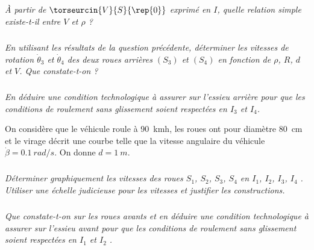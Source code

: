 \begin{multicols}{2}
\subparagraph{}
\textit{À partir de $\torseurcin{V}{S}{\rep{0}}$ exprimé en $I$, quelle relation simple existe-t-il entre $V$ et $\rho$ ?}
\ifprof%
\begin{corrige}
\end{corrige}\else\fi
\subparagraph{}
\textit{En utilisant les résultats de la question précédente, déterminer les vitesses de rotation $\dot{\theta}_3$ et $\dot{\theta}_4$ des deux roues arrières $(S_3)$ et $(S_4)$ en fonction de $\rho$, $R$, $d$ et $V$. Que constate-t-on ? }
\ifprof%
\begin{corrige}
\end{corrige}\else\fi
\subparagraph{}
\textit{En déduire une condition technologique à assurer sur l'essieu arrière pour que les conditions de roulement sans glissement soient respectées en $I_3$ et $I_4$. }
\ifprof%
\begin{corrige}
\end{corrige}\else\fi

On considère que le véhicule roule à \SI{90}{km}{h}, les roues ont pour diamètre \SI{80}{cm} et le virage décrit une courbe telle que la vitesse angulaire du véhicule  $\dot{\beta}=\SI{0,1}{rad/s}$. On donne $d=\SI{1}{m}$. 

\subparagraph{}
\textit{Déterminer graphiquement les vitesses des roues $S_1$, $S_2$, $S_3$, $S_4$ en $I_1$, $I_2$, $I_3$, $I_4$ . Utiliser une échelle judicieuse pour les vitesses et  justifier les constructions.}
\ifprof%
\begin{corrige}
\end{corrige}\else\fi
\subparagraph{}
\textit{Que constate-t-on sur les roues avants et en déduire une condition technologique à assurer sur l'essieu avant pour que les conditions de roulement sans glissement soient respectées en $I_1$ et $I_2$ . }
\ifprof%
\begin{corrige}
\end{corrige}\else\fi


\ifprof
\else
\end{multicols}
\fi


